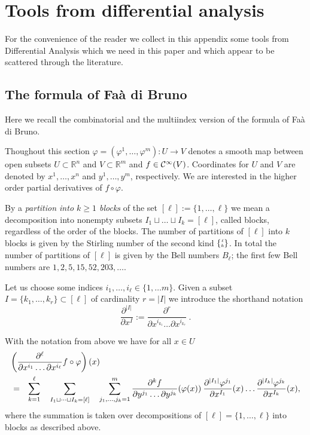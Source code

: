 \section{Tools  from differential analysis}
%
For the convenience of the reader we collect in this appendix some tools from 
Differential Analysis which we need in this paper and which appear to be 
scattered through the literature. 

\subsection{The formula of Fa{\`a} di Bruno}
\label{sec:formula-faa-di-bruno}
Here we recall the combinatorial and the multiindex version of the formula 
of Fa{\`a} di Bruno. 

Thoughout this section $\varphi=(\varphi^1, \dots ,\varphi^m): U\to V$ denotes a smooth map between open subsets $U\subset \mathbb R^n$ and $V\subset \mathbb R^m$ and $f\in \mathcal{C}^\infty(V)$. Coordinates for $U$ and $V$  are denoted by $x^1,\dots,x^n$ and $y^1,\dots,y^m$, respectively. We are interested in the higher order partial derivatives of $f\circ \varphi$. 

By a \emph{partition into $k\ge 1$ blocks} of the set $[\ell]:=\{1,\dots,\ell\}$ we mean a decomposition into nonempty subsets $I_1\sqcup\dots\sqcup I_k=[\ell]$, called blocks, regardless of the order of the blocks. The number of partitions of  $[\ell]$ into $k$ blocks is given by the Stirling number of the second kind $\{\tiny\begin{matrix}\ell\\k\end{matrix}\tiny\}$. In total the number of partitions of $[\ell]$ is given by the Bell numbers $B_\ell$; the first few Bell numbers are $1, 2, 5, 15, 52, 203,\dots$.

Let us choose some indices $i_1,\dots,i_\ell \in \{1,\dots m\}$. Given a subset $I=\{k_1,\dots,k_r\}\subset [\ell]$ of cardinality $r=|I|$ we introduce the shorthand notation 
\[\frac{\partial^{|I|}}{\partial x^I}:=\frac{\partial^r}{\partial x^{i_{k_1}}\dots \partial x^{i_{k_r}}}\:.\]

\begin{theorem}\label{FdBcomb} With the notation from above we have for all $x\in U$
\begin{eqnarray*}
\lefteqn{\left(\frac{\partial^\ell}{\partial x^{i_1}\dots \partial x^{i_\ell}}f\circ \varphi\right)(x)}&&\\
\nonumber&=&\sum_{k=1}^\ell\quad\sum_{I_1\sqcup\dots\sqcup I_k=[\ell]}\quad\sum_{j_1,\dots,j_k=1}^m\frac{\partial^kf}{\partial y^{j_1}\dots \partial y^{j_k}}(\varphi(x))\:\frac{\partial^{|I_1|} \varphi^{j_1}}{\partial x^{I_1}}(x)\dots\frac{\partial^{|I_k|} \varphi ^{j_k}}{\partial x^{I_k}}(x),
\end{eqnarray*}
where the summation is taken over decompositions of $[\ell]=\{1,\dots,\ell\}$ into blocks as described above.\end{theorem}

